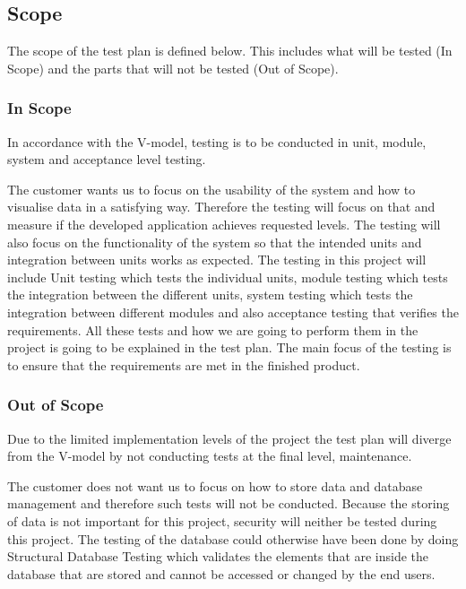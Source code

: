 \subsection{Scope}
The scope of the test plan is defined below. This includes what will be tested (In Scope) and the parts that will not be tested (Out of Scope).  

\subsubsection{In Scope}
In accordance with the V-model, testing is to be conducted in unit, module, system and acceptance level testing. \newline

\noindent The customer wants us to focus on the usability of the system and how to visualise data in a satisfying way.  Therefore the testing will focus on that and measure if the developed application achieves requested levels. The testing will also focus on the functionality of the system so that the intended units and integration between units works as expected. The testing in this project will include Unit testing which tests the individual units, module testing which tests the integration between the different units, system testing which tests the integration between different modules and also acceptance testing that verifies the requirements. All these tests and how we are going to perform them in the project is going to be explained in the test plan. The main focus of the testing is to ensure that the requirements are met in the finished product. 

\subsubsection{Out of Scope} 
Due to the limited implementation levels of the project the test plan will diverge from the V-model by not conducting tests at the final level, maintenance. \newline

\noindent The customer does not want us to focus on how to store data and database management and therefore such tests will not be conducted. Because the storing of data is not important  for this project, security will neither be tested during this project. The testing of the database could otherwise have been done by doing Structural Database Testing which validates the elements that are inside the database that are stored and cannot be accessed or changed by the end users. 

